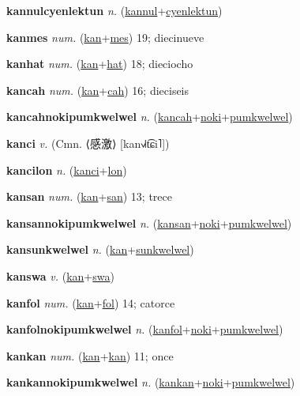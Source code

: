 \textbf{\hypertarget{kannulcyenlektun}{kannulcyenlektun}} \textit{n.} (\hyperlink{kannul}{kannul}+\allowbreak \hyperlink{cyenlektun}{cyenlektun})


\textbf{\hypertarget{kanmes}{kanmes}} \textit{num.} (\hyperlink{kan}{kan}+\allowbreak \hyperlink{mes}{mes})
19; diecinueve

\textbf{\hypertarget{kanhat}{kanhat}} \textit{num.} (\hyperlink{kan}{kan}+\allowbreak \hyperlink{hat}{hat})
18; dieciocho

\textbf{\hypertarget{kancah}{kancah}} \textit{num.} (\hyperlink{kan}{kan}+\allowbreak \hyperlink{cah}{cah})
16; dieciseis

\textbf{\hypertarget{kancahnokipumkwelwel}{kancahnokipumkwelwel}} \textit{n.} (\hyperlink{kancah}{kancah}+\allowbreak \hyperlink{noki}{noki}+\allowbreak \hyperlink{pumkwelwel}{pumkwelwel})


\textbf{\hypertarget{kanci}{kanci}} \textit{v.} (Cmn. ⟨{\chinese{}感激}⟩ [kan˧˩˧t͡ɕi˥])


\textbf{\hypertarget{kancilon}{kancilon}} \textit{n.} (\hyperlink{kanci}{kanci}+\allowbreak \hyperlink{lon}{lon})


\textbf{\hypertarget{kansan}{kansan}} \textit{num.} (\hyperlink{kan}{kan}+\allowbreak \hyperlink{san}{san})
13; trece

\textbf{\hypertarget{kansannokipumkwelwel}{kansannokipumkwelwel}} \textit{n.} (\hyperlink{kansan}{kansan}+\allowbreak \hyperlink{noki}{noki}+\allowbreak \hyperlink{pumkwelwel}{pumkwelwel})


\textbf{\hypertarget{kansunkwelwel}{kansunkwelwel}} \textit{n.} (\hyperlink{kan}{kan}+\allowbreak \hyperlink{sunkwelwel}{sunkwelwel})


\textbf{\hypertarget{kanswa}{kanswa}} \textit{v.} (\hyperlink{kan}{kan}+\allowbreak \hyperlink{swa}{swa})


\textbf{\hypertarget{kanfol}{kanfol}} \textit{num.} (\hyperlink{kan}{kan}+\allowbreak \hyperlink{fol}{fol})
14; catorce

\textbf{\hypertarget{kanfolnokipumkwelwel}{kanfolnokipumkwelwel}} \textit{n.} (\hyperlink{kanfol}{kanfol}+\allowbreak \hyperlink{noki}{noki}+\allowbreak \hyperlink{pumkwelwel}{pumkwelwel})


\textbf{\hypertarget{kankan}{kankan}} \textit{num.} (\hyperlink{kan}{kan}+\allowbreak \hyperlink{kan}{kan})
11; once

\textbf{\hypertarget{kankannokipumkwelwel}{kankannokipumkwelwel}} \textit{n.} (\hyperlink{kankan}{kankan}+\allowbreak \hyperlink{noki}{noki}+\allowbreak \hyperlink{pumkwelwel}{pumkwelwel})


